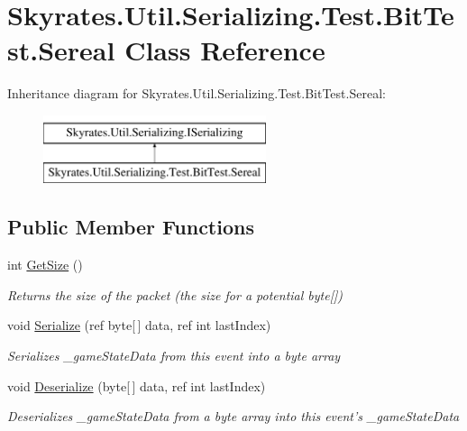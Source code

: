 \hypertarget{class_skyrates_1_1_util_1_1_serializing_1_1_test_1_1_bit_test_1_1_sereal}{\section{Skyrates.\-Util.\-Serializing.\-Test.\-Bit\-Test.\-Sereal Class Reference}
\label{class_skyrates_1_1_util_1_1_serializing_1_1_test_1_1_bit_test_1_1_sereal}
}
Inheritance diagram for Skyrates.\-Util.\-Serializing.\-Test.\-Bit\-Test.\-Sereal\-:\begin{figure}[H]
\begin{center}
\leavevmode
\includegraphics[height=2.000000cm]{class_skyrates_1_1_util_1_1_serializing_1_1_test_1_1_bit_test_1_1_sereal}
\end{center}
\end{figure}
\subsection*{Public Member Functions}
\begin{DoxyCompactItemize}
\item 
int \hyperlink{class_skyrates_1_1_util_1_1_serializing_1_1_test_1_1_bit_test_1_1_sereal_a6456ce574a586d23a4e301399283a61b}{Get\-Size} ()
\begin{DoxyCompactList}\small\item\em Returns the size of the packet (the size for a potential byte\mbox{[}\mbox{]}) \end{DoxyCompactList}\item 
void \hyperlink{class_skyrates_1_1_util_1_1_serializing_1_1_test_1_1_bit_test_1_1_sereal_a76abc2eb08c20162674796b953808e5f}{Serialize} (ref byte\mbox{[}$\,$\mbox{]} data, ref int last\-Index)
\begin{DoxyCompactList}\small\item\em Serializes \-\_\-game\-State\-Data from this event into a byte array \end{DoxyCompactList}\item 
void \hyperlink{class_skyrates_1_1_util_1_1_serializing_1_1_test_1_1_bit_test_1_1_sereal_a7bea9b3a1c45140eaa124ecf4237bdf8}{Deserialize} (byte\mbox{[}$\,$\mbox{]} data, ref int last\-Index)
\begin{DoxyCompactList}\small\item\em Deserializes \-\_\-game\-State\-Data from a byte array into this event's \-\_\-game\-State\-Data \end{DoxyCompactList}\end{DoxyCompactItemize}
